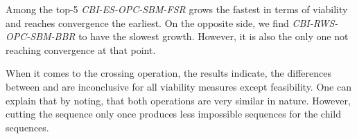 \documentclass[./../../paper.tex]{subfiles}
\begin{document}
Among the top-5 \emph{CBI-ES-OPC-SBM-FSR} grows the fastest in terms of viability and reaches convergence the earliest. On the opposite side, we find \emph{CBI-RWS-OPC-SBM-BBR} to have the slowest growth. However, it is also the only one not reaching convergence at that point.  

When it comes to the crossing operation, the results indicate, the differences between  and  are inconclusive for all viability measures except feasibility. One can explain that by noting, that both operations are very similar in nature. However, cutting the sequence only once produces less impossible sequences for the child sequences.
\end{document}
